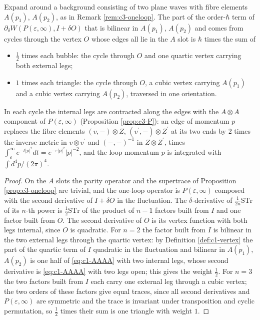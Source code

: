 \begin{lemma}
\label{lem:c5-cycle}
Expand around a background consisting of two plane waves with fibre elements $A(p_1)$, $A(p_2)$, as in Remark \ref{rem:c3-oneloop}. The part of the order-$\hbar$ term of $\partial_\delta W(P(\varepsilon,\infty),I+\delta O)$ that is bilinear in $A(p_1)$, $A(p_2)$ and comes from cycles through the vertex $O$ whose edges all lie in the $A$ slot is $\hbar$ times the sum of
\begin{itemize}
\item $\tfrac12$ times each bubble: the cycle through $O$ and one quartic vertex carrying both external legs;
\item $1$ times each triangle: the cycle through $O$, a cubic vertex carrying $A(p_1)$ and a cubic vertex carrying $A(p_2)$, traversed in one orientation.
\end{itemize}
In each cycle the internal legs are contracted along the edges with the $A\otimes A$ component of $P(\varepsilon,\infty)$ (Proposition \ref{prop:c3-P}): an edge of momentum $p$ replaces the fibre elements $(v,-)\otimes Z$, $(v^{\prime},-)\otimes Z^{\prime}$ at its two ends by $2$ times the inverse metric in $v\otimes v^{\prime}$ and $(-,-)^{-1}$ in $Z\otimes Z^{\prime}$, times $\int_\varepsilon^\infty e^{-t|p|^2}dt=e^{-\varepsilon|p|^2}|p|^{-2}$, and the loop momentum $p$ is integrated with $\int d^4p/(2\pi)^4$.
\end{lemma}

\begin{proof}
On the $A$ slots the parity operator and the supertrace of Proposition \ref{prop:c3-oneloop} are trivial, and the one-loop operator is $P(\varepsilon,\infty)$ composed with the second derivative of $I+\delta O$ in the fluctuation. The $\delta$-derivative of $\frac1{2n}\mathrm{STr}$ of its $n$-th power is $\frac12\mathrm{STr}$ of the product of $n-1$ factors built from $I$ and one factor built from $O$. The second derivative of $O$ is its vertex function with both legs internal, since $O$ is quadratic. For $n=2$ the factor built from $I$ is bilinear in the two external legs through the quartic vertex: by Definition \ref{def:c1-vertex} the part of the quartic term of $I$ quadratic in the fluctuation and bilinear in $A(p_1)$, $A(p_2)$ is one half of \eqref{eq:c1-AAAA} with two internal legs, whose second derivative is \eqref{eq:c1-AAAA} with two legs open; this gives the weight $\tfrac12$. For $n=3$ the two factors built from $I$ each carry one external leg through a cubic vertex; the two orders of these factors give equal traces, since all second derivatives and $P(\varepsilon,\infty)$ are symmetric and the trace is invariant under transposition and cyclic permutation, so $\tfrac12$ times their sum is one triangle with weight $1$.
\end{proof}


